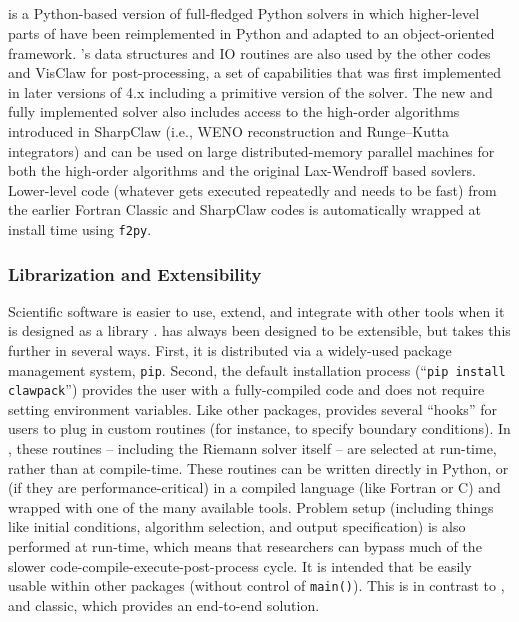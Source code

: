 %
%
%

\subsection{\pyclaw} \label{sec:pyclaw}

\pyclaw is a Python-based version of full-fledged Python solvers in which
higher-level parts of \clawpack have been reimplemented in Python and adapted to
an object-oriented framework.  \pyclaw's data structures and IO routines are
also used by the other \clawpack codes and VisClaw for post-processing, a set of
capabilities that was first implemented in later versions of 4.x including a
primitive version of the solver.  The new and fully implemented solver also
includes access to the high-order algorithms introduced in SharpClaw (i.e., WENO
reconstruction and Runge--Kutta integrators) and can be used on large
distributed-memory parallel machines for both the high-order algorithms and the
original Lax-Wendroff based sovlers.  Lower-level code (whatever gets executed
repeatedly and needs to be fast) from the earlier Fortran Classic and SharpClaw
codes is automatically wrapped at install time using \texttt{f2py}.

\subsubsection{Librarization and Extensibility}
Scientific software is easier to use, extend, and integrate with other tools
when it is designed as a library \cite{Brown:2015cj}.  \clawpack has always been
designed to be extensible, but \pyclaw takes this further in several ways.
First, it is distributed via a widely-used package management system,
\texttt{pip}. Second, the default installation process (``\texttt{pip install
clawpack}'') provides the user with a fully-compiled code and does not require
setting environment variables.  Like other \clawpack packages, \pyclaw provides
several ``hooks'' for users to plug in custom routines (for instance, to specify
boundary conditions). In \pyclaw, these routines -- including the Riemann solver
itself -- are selected at run-time, rather than at compile-time.  These routines
can be written directly in Python, or (if they are performance-critical) in a
compiled language (like Fortran or C) and wrapped with one of the many available
tools.  Problem setup (including things like initial conditions, algorithm
selection, and output specification) is also performed at run-time, which means
that researchers can bypass much of the slower code-compile-execute-post-process
cycle. It is intended that \pyclaw be easily usable within other packages
(without control of \texttt{main()}).  This is in contrast to \amrclaw, \geoclaw
and classic, which provides an end-to-end solution.

